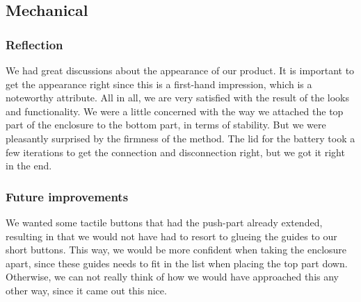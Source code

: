 \subsection{Mechanical}
\label{sec:discussion_mechanical}

\subsubsection{Reflection}
We had great discussions about the appearance of our product. It is important to get the appearance right since this is a first-hand impression, which is a noteworthy attribute. All in all, we are very satisfied with the result of the looks and functionality. We were a little concerned with the way we attached the top part of the enclosure to the bottom part, in terms of stability. But we were pleasantly surprised by the firmness of the method. The lid for the battery took a few iterations to get the connection and disconnection right, but we got it right in the end.
\subsubsection{Future improvements}
We wanted some tactile buttons that had the push-part already extended, resulting in that we would not have had to resort to glueing the guides to our short buttons. This way, we would be more confident when taking the enclosure apart, since these guides needs to fit in the list when placing the top part down. Otherwise, we can not really think of how we would have approached this any other way, since it came out this nice.